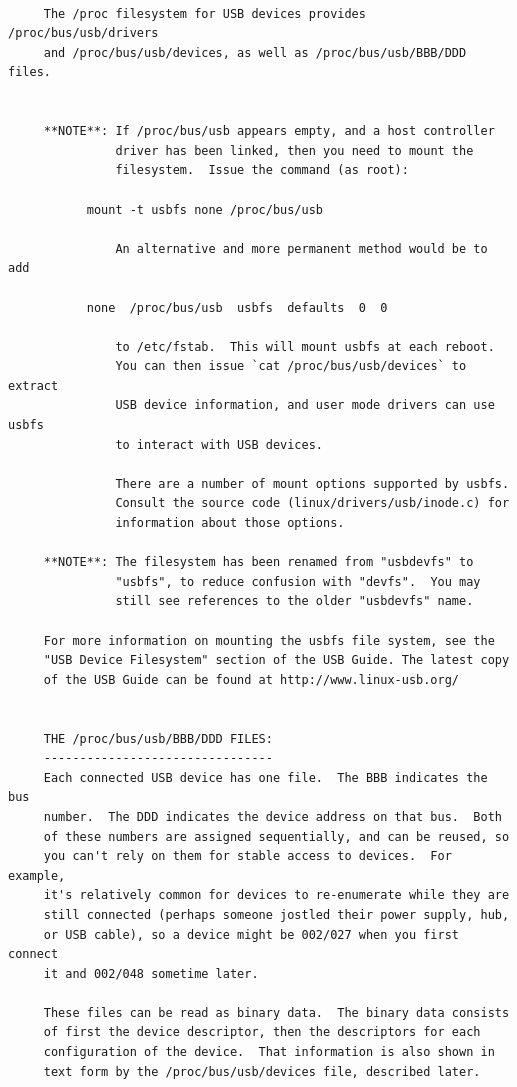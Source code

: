 {{{{{{{{{\begin{verbatim}
     
     The /proc filesystem for USB devices provides /proc/bus/usb/drivers
     and /proc/bus/usb/devices, as well as /proc/bus/usb/BBB/DDD files.
     
     
     **NOTE**: If /proc/bus/usb appears empty, and a host controller
               driver has been linked, then you need to mount the
               filesystem.  Issue the command (as root):
     
           mount -t usbfs none /proc/bus/usb
     
               An alternative and more permanent method would be to add
     
           none  /proc/bus/usb  usbfs  defaults  0  0
     
               to /etc/fstab.  This will mount usbfs at each reboot.
               You can then issue `cat /proc/bus/usb/devices` to extract
               USB device information, and user mode drivers can use usbfs
               to interact with USB devices.
     
               There are a number of mount options supported by usbfs.
               Consult the source code (linux/drivers/usb/inode.c) for
               information about those options.
     
     **NOTE**: The filesystem has been renamed from "usbdevfs" to
               "usbfs", to reduce confusion with "devfs".  You may
               still see references to the older "usbdevfs" name.
     
     For more information on mounting the usbfs file system, see the
     "USB Device Filesystem" section of the USB Guide. The latest copy
     of the USB Guide can be found at http://www.linux-usb.org/
     
     
     THE /proc/bus/usb/BBB/DDD FILES:
     --------------------------------
     Each connected USB device has one file.  The BBB indicates the bus
     number.  The DDD indicates the device address on that bus.  Both
     of these numbers are assigned sequentially, and can be reused, so
     you can't rely on them for stable access to devices.  For example,
     it's relatively common for devices to re-enumerate while they are
     still connected (perhaps someone jostled their power supply, hub,
     or USB cable), so a device might be 002/027 when you first connect
     it and 002/048 sometime later.
     
     These files can be read as binary data.  The binary data consists
     of first the device descriptor, then the descriptors for each
     configuration of the device.  That information is also shown in
     text form by the /proc/bus/usb/devices file, described later.
     

\end{verbatim}}}}}}}}}}
